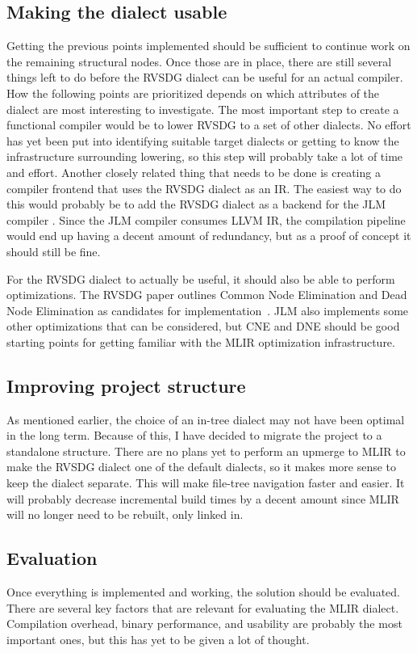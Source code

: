 \subsection{Making the dialect usable}
Getting the previous points implemented should be sufficient to continue work on the remaining structural nodes. Once those are in place, there are still several things left to do before the RVSDG dialect can be useful for an actual compiler. How the following points are prioritized depends on which attributes of the dialect are most interesting to investigate. The most important step to create a functional compiler would be to lower RVSDG to a set of other dialects. No effort has yet been put into identifying suitable target dialects or getting to know the infrastructure surrounding lowering, so this step will probably take a lot of time and effort. Another closely related thing that needs to be done is creating a compiler frontend that uses the RVSDG dialect as an IR. The easiest way to do this would probably be to add the RVSDG dialect as a backend for the JLM compiler \cite{reissmann_github_2022}. Since the JLM compiler consumes LLVM IR, the compilation pipeline would end up having a decent amount of redundancy, but as a proof of concept it should still be fine.

For the RVSDG dialect to actually be useful, it should also be able to perform optimizations. The RVSDG paper outlines Common Node Elimination and Dead Node Elimination as candidates for implementation~\cite{Reissmann2020}. JLM also implements some other optimizations that can be considered, but CNE and DNE should be good starting points for getting familiar with the MLIR optimization infrastructure.

\subsection{Improving project structure}
As mentioned earlier, the choice of an in-tree dialect may not have been optimal in the long term. Because of this, I have decided to migrate the project to a standalone structure. There are no plans yet to perform an upmerge to MLIR to make the RVSDG dialect one of the default dialects, so it makes more sense to keep the dialect separate. This will make file-tree navigation faster and easier. It will probably decrease incremental build times by a decent amount since MLIR will no longer need to be rebuilt, only linked in.

\subsection{Evaluation} %
Once everything is implemented and working, the solution should be evaluated. There are several key factors that are relevant for evaluating the MLIR dialect. Compilation overhead, binary performance, and usability are probably the most important ones, but this has yet to be given a lot of thought.
